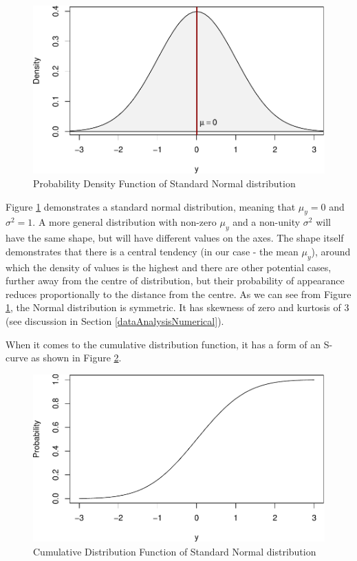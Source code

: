 \documentclass[
]{book}
\theoremstyle{definition}
\theoremstyle{definition}
\theoremstyle{definition}
\theoremstyle{definition}
\theoremstyle{remark}
\begin{document}
\begin{figure}
\centering
\includegraphics{Svetunkov---Statistics-for-Business-Analytics_files/figure-latex/dnormPlot-1.pdf}
\caption{\label{fig:dnormPlot}Probability Density Function of Standard Normal distribution}
\end{figure}

Figure \ref{fig:dnormPlot} demonstrates a standard normal distribution, meaning that \(\mu_y=0\) and \(\sigma^2=1\). A more general distribution with non-zero \(\mu_y\) and a non-unity \(\sigma^2\) will have the same shape, but will have different values on the axes. The shape itself demonstrates that there is a central tendency (in our case - the mean \(\mu_y\)), around which the density of values is the highest and there are other potential cases, further away from the centre of distribution, but their probability of appearance reduces proportionally to the distance from the centre. As we can see from Figure \ref{fig:dnormPlot}, the Normal distribution is symmetric. It has skewness of zero and kurtosis of 3 (see discussion in Section \ref{dataAnalysisNumerical}).

When it comes to the cumulative distribution function, it has a form of an S-curve as shown in Figure \ref{fig:pnormPlot}.

\begin{figure}
\centering
\includegraphics{Svetunkov---Statistics-for-Business-Analytics_files/figure-latex/pnormPlot-1.pdf}
\caption{\label{fig:pnormPlot}Cumulative Distribution Function of Standard Normal distribution}
\end{figure}
\end{document}

